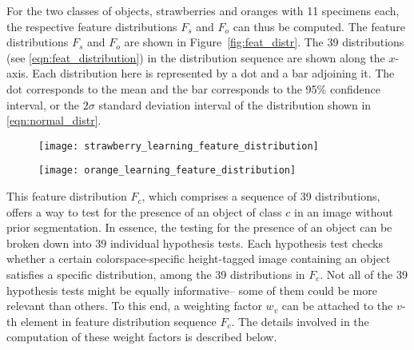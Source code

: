 For the two classes of objects, strawberries and oranges with 11 specimens each, the respective feature distributions $F_s$ and $F_o$ can thus be computed. The feature distributions $F_s$ and $F_o$ are shown in Figure~\ref{fig:feat_distr}. The 39 distributions (see \eqref{eqn:feat_distribution}) in the distribution sequence are shown along the $x$-axis. Each distribution here is represented by a dot and a bar adjoining it. The dot corresponds to the mean and the bar corresponds to the 95\% confidence interval, or the $2\sigma$ standard deviation interval of the distribution shown in \eqref{eqn:normal_distr}.
%
\begin{figure*}
  \centering
  \begin{subfigure}[]{0.8\textwidth}
      \texttt{[image: strawberry\_learning\_feature\_distribution]}
      \caption{}
      \label{fig:feat_distr_strawberry}
  \end{subfigure}
  \begin{subfigure}[]{0.8\textwidth}
      \texttt{[image: orange\_learning\_feature\_distribution]}
      \caption{}
      \label{fig:feat_distr_orange}
  \end{subfigure}
\caption[Feature distribution]{Strawberry feature distribution sequence $F_s$ () and orange feature distribution sequence $F_o$ () generated from 11 strawberry specimens and 11 orange specimens. All 39 distributions indexed by $v$ are shown along the $x$-axis. The  mean of each distribution is shown as a dot along with the 95\% confidence interval shown as a bar.}
\label{fig:feat_distr}
\end{figure*}	
%

This feature distribution $F_c$, which comprises a sequence of 39 distributions, offers a way to test for the presence of an object of class $c$ in an image without prior segmentation. In essence, the testing for the presence of an object can be broken down into 39 individual hypothesis tests. Each hypothesis test checks whether a certain colorspace-specific height-tagged image containing an object satisfies a specific distribution, among the 39 distributions in $F_c$. Not all of the 39 hypothesis tests might be equally informative-- some of them could be more relevant than others. To this end, a weighting factor $w_{v}$ can be attached to the $v$-th element in feature distribution sequence $F_c$.  The details involved in the computation of these weight factors is described below.

